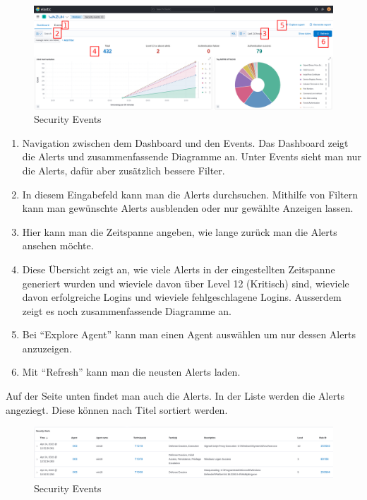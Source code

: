 \begin{figure}[H]
    \centering
    \includegraphics[width=\linewidth]{../img/wazuh-se-1.png}
    \caption{Security Events}
\end{figure}
\begin{enumerate}
    \item Navigation zwischen dem Dashboard und den Events. Das Dashboard zeigt die Alerts und zusammenfassende Diagramme an. Unter Events sieht man nur die Alerts, dafür aber zusätzlich bessere Filter.
    \item In diesem Eingabefeld kann man die Alerts durchsuchen. Mithilfe von Filtern kann man gewünschte Alerts ausblenden oder nur gewählte Anzeigen lassen.
    \item Hier kann man die Zeitspanne angeben, wie lange zurück man die Alerts ansehen möchte.
    \item Diese Übersicht zeigt an, wie viele Alerts in der eingestellten Zeitspanne generiert wurden und wieviele davon über Level 12 (Kritisch) sind, wieviele davon erfolgreiche Logins und wieviele fehlgeschlagene Logins. Ausserdem zeigt es noch zusammenfassende Diagramme an.
    \item Bei ``Explore Agent'' kann man einen Agent auswählen um nur dessen Alerts anzuzeigen.
    \item Mit ``Refresh'' kann man die neusten Alerts laden.
\end{enumerate}

Auf der Seite unten findet man auch die Alerts. 
In der Liste werden die Alerts angeziegt. 
Diese können nach Titel sortiert werden. 
\begin{figure}[H]
    \centering
    \includegraphics[width=\linewidth]{../img/wazuh-se-2.png}
    \caption{Security Events}
\end{figure}


